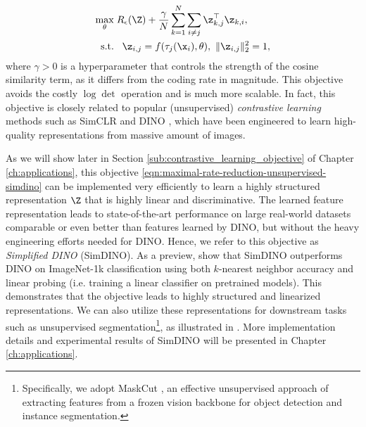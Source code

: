 \documentclass[../../book-main.tex]{subfiles}
\begin{document}
\begin{equation}
	\begin{aligned}
		\max_{\theta } & \;  R_{\epsilon}(\Z) + \frac{\gamma}{N}\sum_{k=1}^N \sum_{i \neq j} \z_{k,j}^\top \z_{k,i}, \\
		\mbox{s.t.} &  \ \ \, \z_{i,j} = f(\tau_j(\x_i),\theta),\  \|\z_{i,j}\|_2^2                                          = 1, 
	\end{aligned}
	\label{eqn:maximal-rate-reduction-unsupervised-simdino}
\end{equation}
where $\gamma > 0$ is a hyperparameter that controls the strength of the cosine similarity term, as it differs from the coding rate in magnitude. This objective avoids the costly $\log \det$ operation and is much more scalable. In fact, this objective is closely related to popular (unsupervised) {\em contrastive learning} methods such as SimCLR \cite{chen2020simple} and DINO \cite{caron2021emerging}, which have been engineered to learn high-quality representations from massive amount of images. 

As we will show later in Section \ref{sub:contrastive_learning_objective} of Chapter \ref{ch:applications}, this objective \eqref{eqn:maximal-rate-reduction-unsupervised-simdino} can be implemented very efficiently to learn a highly structured  representation $\Z$ that is highly linear and discriminative. 
The learned feature representation leads to state-of-the-art performance on large real-world datasets comparable or even better than features learned by DINO, but without the heavy engineering efforts needed for DINO. Hence, we refer to this objective as {\em Simplified DINO} (SimDINO). As a preview,  show that SimDINO outperforms DINO on ImageNet-1k classification using both \(k\)-nearest neighbor accuracy and linear probing (i.e. training a linear classifier on pretrained models). This demonstrates that the objective leads to highly structured and linearized representations. We can also utilize these representations for downstream tasks such as unsupervised segmentation\footnote{Specifically, we adopt MaskCut \cite{wang2023cut}, an effective unsupervised approach of extracting features from a frozen vision backbone for object detection and instance segmentation.}, as illustrated in . More implementation details and experimental results of SimDINO will be presented in Chapter \ref{ch:applications}.
\end{document}
